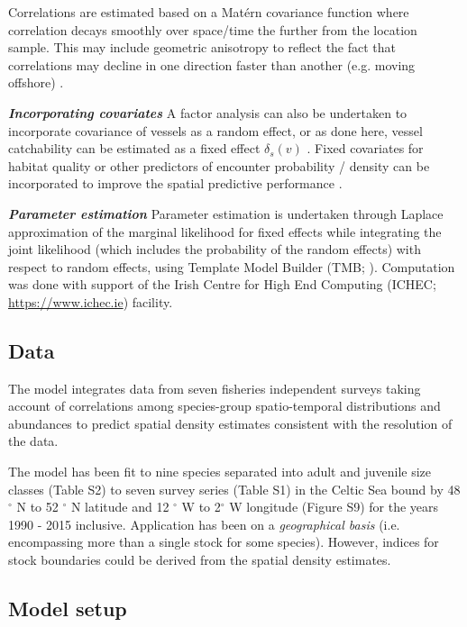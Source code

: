 \documentclass{nature}
\begin{document}
\begin{linenumbers}
Correlations are estimated based on a Matérn covariance function where
correlation decays smoothly over space/time the further from the location
sample. This may include geometric anisotropy to reflect the fact that
correlations may decline in one direction faster than another (e.g. moving
offshore) \cite{Thorson2013}.

\textbf{\textit{Incorporating covariates}} A factor analysis can also be
undertaken to incorporate covariance of vessels as a random effect, or as done
here, vessel catchability can be estimated as a fixed effect $\delta_{s}(v)$
\cite{Thorson2014}. Fixed covariates for habitat quality or other predictors of
encounter probability / density can be incorporated to improve the spatial
predictive performance \cite{Thorson2017}.

\textbf{\textit{Parameter estimation}} Parameter estimation is undertaken
through Laplace approximation of the marginal likelihood for fixed effects
while integrating the joint likelihood (which includes the probability of the
random effects) with respect to random effects, using Template Model Builder
(TMB; \cite{Kristensen2015}). Computation was done with support of the Irish
Centre for High End Computing (ICHEC; \url{https://www.ichec.ie}) facility.  \\


\subsection{Data}

The model integrates data from seven fisheries independent surveys taking
account of correlations among species-group spatio-temporal distributions and
abundances to predict spatial density estimates consistent with the resolution
of the data. 

The model has been fit to nine species separated into adult and juvenile size
classes (Table S2) to seven survey series (Table S1) in the Celtic Sea bound by
48$^{\circ}$ N to 52 $^{\circ}$ N latitude and 12 $^{\circ}$ W to 2$^{\circ}$ W
longitude (Figure S9) for the years 1990 - 2015 inclusive.  Application has
been on a \textit{geographical basis} (i.e.  encompassing more than a single
stock for some species). However, indices for stock boundaries could be derived
from the spatial density estimates. \\


\subsection{Model setup}


\end{linenumbers}
\end{document}

